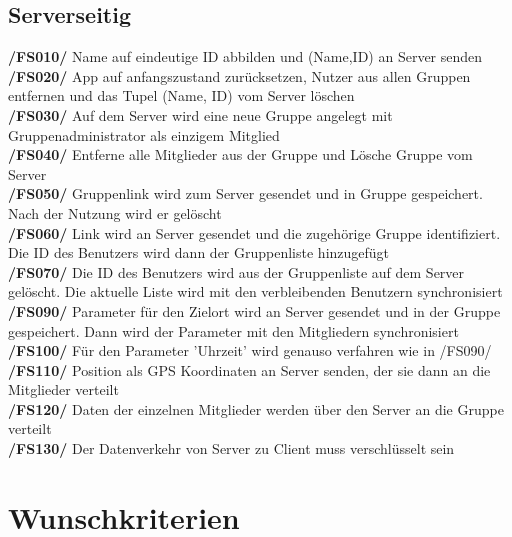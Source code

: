 \subsection{Serverseitig}
     \textbf{/FS010/} Name auf eindeutige ID abbilden und (Name,ID) an Server senden\\
     \textbf{/FS020/} App auf anfangszustand zurücksetzen, Nutzer aus allen Gruppen entfernen und das Tupel (Name, ID) vom Server löschen \\
     \textbf{/FS030/} Auf dem Server wird eine neue Gruppe angelegt mit Gruppenadministrator als einzigem Mitglied\\
     \textbf{/FS040/} Entferne alle Mitglieder aus der Gruppe und Lösche Gruppe vom Server\\
     \textbf{/FS050/} Gruppenlink wird zum Server gesendet und in Gruppe gespeichert. Nach der Nutzung wird er gelöscht\\
     \textbf{/FS060/} Link wird an Server gesendet und die zugehörige Gruppe identifiziert.\\ Die ID des Benutzers wird dann der Gruppenliste hinzugefügt\\
     \textbf{/FS070/} Die ID des Benutzers wird aus der Gruppenliste auf dem Server gelöscht. Die aktuelle Liste wird mit den verbleibenden Benutzern synchronisiert\\
     \textbf{/FS090/} Parameter für den Zielort wird an Server gesendet und in der Gruppe gespeichert. Dann wird der Parameter mit den Mitgliedern synchronisiert \\
     \textbf{/FS100/} Für den Parameter 'Uhrzeit' wird genauso verfahren wie in /FS090/ \\
     \textbf{/FS110/} Position als GPS Koordinaten an Server senden, der sie dann an die Mitglieder verteilt\\
     \textbf{/FS120/} Daten der einzelnen Mitglieder werden über den Server an die Gruppe verteilt \\
     \textbf{/FS130/} Der Datenverkehr von Server zu Client muss verschlüsselt sein\\
\section{Wunschkriterien}
